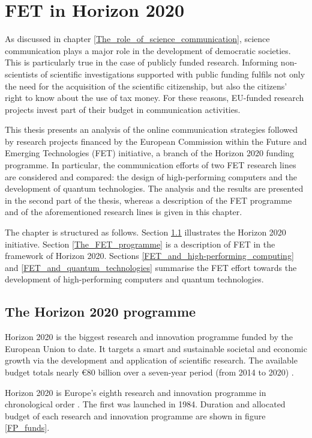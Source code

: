 \chapter{FET in Horizon 2020} \label{FET_in_Horizon_2020}
As discussed in chapter \ref{The_role_of_science_communication}, science communication plays a major role in the development of democratic societies. This is particularly true in the case of publicly funded research. Informing non-scientists of scientific investigations supported with public funding fulfils not only the need for the acquisition of the scientific citizenship, but also the citizens' right to know about the use of tax money. For these reasons, EU-funded research projects invest part of their budget in communication activities. 

This thesis presents an analysis of the online communication strategies followed by research projects financed by the European Commission within the Future and Emerging Technologies (FET) initiative, a branch of the Horizon 2020 funding programme. In particular, the communication efforts of two FET research lines are considered and compared: the design of high-performing computers and the development of quantum technologies. The analysis and the results are presented in the second part of the thesis, whereas a description of the FET programme and of the aforementioned research lines is given in this chapter. 

The chapter is structured as follows. Section \ref{The_Horizon_2020_programme} illustrates the Horizon 2020 initiative. Section \ref{The_FET_programme} is a description of FET in the framework of Horizon 2020. Sections \ref{FET_and_high-performing_computing} and \ref{FET_and_quantum_technologies} summarise the FET effort towards the development of high-performing computers and quantum technologies.

\section{The Horizon 2020 programme} \label{The_Horizon_2020_programme}
Horizon 2020 is the biggest research and innovation programme funded by the European Union to date. It targets a smart and sustainable societal and economic growth via the development and application of scientific research. The available budget totals nearly \euro 80 billion over a seven-year period (from 2014 to 2020) \cite{Horizon2020}.

Horizon 2020 is Europe's eighth research and innovation programme in chronological order \cite{FP4,FP5,FP6,FP7}. The first was launched in 1984. Duration and allocated budget of each research and innovation programme are shown in figure \ref{FP_funds}.

